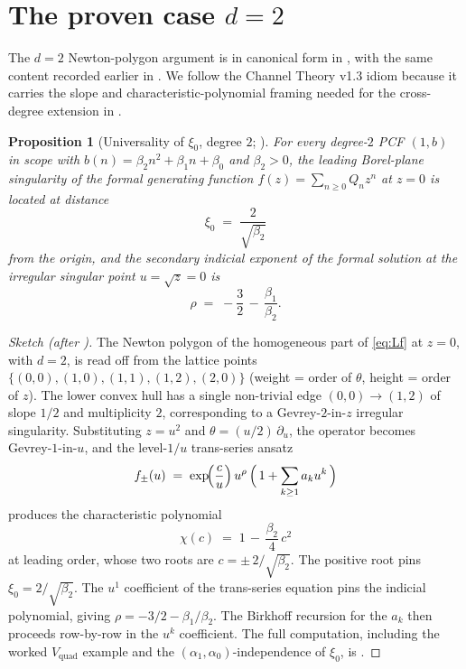 \documentclass[11pt,reqno]{amsart}
\theoremstyle{plain}
\newtheorem{proposition}[theorem]{Proposition}
\theoremstyle{definition}
\theoremstyle{remark}
\begin{document}
\section{The proven case \texorpdfstring{$d = 2$}{d=2}}
\label{sec:d2}

The $d = 2$ Newton-polygon argument is in canonical form in
\cite[Proposition~3.3.A and Worked Example
\S3.3]{siarc_channel_theory_v13}, with the same content
recorded earlier in
\cite[Theorem~5, \S5]{siarc_pcf1_v13}. We follow the
Channel Theory v1.3 idiom because it carries the slope and
characteristic-polynomial framing needed for the cross-degree
extension in .

\begin{proposition}[Universality of $\xi_0$, degree $2$;
{\cite[Prop.~3.3.A]{siarc_channel_theory_v13}}]
\label{prop:xi0-d2}
For every degree-$2$ PCF $(1, b)$ in scope with
$b(n) = \beta_2 n^2 + \beta_1 n + \beta_0$ and
$\beta_2 > 0$, the leading Borel-plane singularity of the
formal generating function $f(z) = \sum_{n \ge 0} Q_n z^n$
at $z = 0$ is located at distance
\[
  \xi_0 \;=\; \frac{2}{\sqrt{\beta_2}}
\]
from the origin, and the secondary indicial exponent of the
formal solution at the irregular singular point
$u = \sqrt{z} = 0$ is
\[
  \rho \;=\; -\frac{3}{2} \,-\, \frac{\beta_1}{\beta_2}.
\]
\end{proposition}

\begin{proof}[Sketch (after
{\cite[\S3.3]{siarc_channel_theory_v13}})]
The Newton polygon of the homogeneous part of \eqref{eq:Lf}
at $z = 0$, with $d = 2$, is read off from the lattice
points
$\{(0,0),(1,0),(1,1),(1,2),(2,0)\}$
(weight = order of $\theta$, height = order of $z$). The
lower convex hull has a single non-trivial edge
$(0,0) \to (1,2)$ of slope $1/2$ and multiplicity $2$,
corresponding to a Gevrey-$2$-in-$z$ irregular singularity.
Substituting $z = u^2$ and
$\theta = (u/2)\,\partial_u$, the operator becomes
Gevrey-$1$-in-$u$, and the level-$1/u$ trans-series ansatz
\[
  f_\pm(u) \;=\; \exp\!\Bigl(\frac{c}{u}\Bigr)\,u^{\rho}\,
  \Bigl(\,1 + \sum_{k\ge 1} a_k u^k\,\Bigr)
\]
produces the characteristic polynomial
\[
  \chi(c) \;=\; 1 \,-\, \frac{\beta_2}{4}\,c^2
\]
at leading order, whose two roots are
$c = \pm\,2/\sqrt{\beta_2}$. The positive root pins
$\xi_0 = 2/\sqrt{\beta_2}$. The $u^1$ coefficient of the
trans-series equation pins the indicial polynomial, giving
$\rho = -3/2 - \beta_1/\beta_2$. The Birkhoff recursion for
the $a_k$ then proceeds row-by-row in the $u^k$
coefficient. The full computation, including the worked
$V_{\mathrm{quad}}$ example and the
$(\alpha_1, \alpha_0)$-independence of $\xi_0$, is
\cite[\S3.3 Worked Example]{siarc_channel_theory_v13}.
\end{proof}
\end{document}
